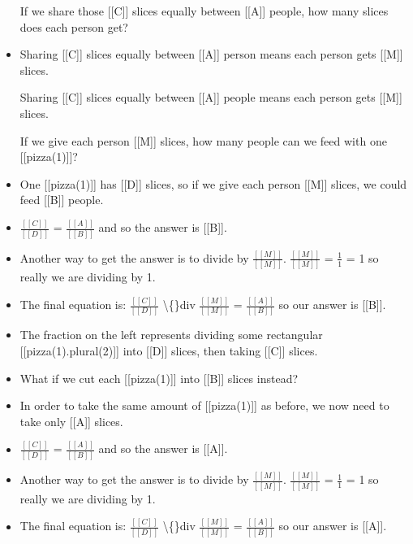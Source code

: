 \documentclass{article}
\begin{document}
\begin{itemize}
                            If we share those [[C]] slices equally between [[A]] people,
                            how many slices does each person get?
  \item Sharing [[C]] slices equally between [[A]] person means each person gets [[M]] slices.
                        
                            Sharing [[C]] slices equally between [[A]] people means each person gets [[M]] slices.
                        
                        
                        If we give each person [[M]] slices, how many people can we feed with one [[pizza(1)]]?
  \item One [[pizza(1)]] has [[D]] slices, so if we give each person
                            [[M]] slices, we could feed [[B]] people.
  \item $\frac{[[C]]}{[[D]]}$ = $\frac{[[A]]}{[[B]]}$ and so the answer is [[B]].
  \item Another way to get the answer is to divide by $\frac{[[M]]}{[[M]]}$.
                        $\frac{[[M]]}{[[M]]}$ = $\frac{1}{1}$ = 1 so really we are dividing by 1.
  \item The final equation is: $\frac{[[C]]}{[[D]]}$ \textbackslash\{\}div $\frac{[[M]]}{[[M]]}$ =
                        $\frac{[[A]]}{[[B]]}$ so our answer is [[B]].
  \item The fraction on the left represents dividing some rectangular [[pizza(1).plural(2)]] into [[D]] slices,
                            then taking [[C]] slices.
  \item What if we cut each [[pizza(1)]] into [[B]] slices instead?
  \item In order to take the same amount of [[pizza(1)]] as before,
                            we now need to take only [[A]] slices.
  \item $\frac{[[C]]}{[[D]]}$ = $\frac{[[A]]}{[[B]]}$ and so the answer is [[A]].
  \item Another way to get the answer is to divide by $\frac{[[M]]}{[[M]]}$.
                        $\frac{[[M]]}{[[M]]}$ = $\frac{1}{1}$ = 1 so really we are dividing by 1.
  \item The final equation is: $\frac{[[C]]}{[[D]]}$ \textbackslash\{\}div $\frac{[[M]]}{[[M]]}$ =
                        $\frac{[[A]]}{[[B]]}$ so our answer is [[A]].
\end{itemize}
\end{document}
